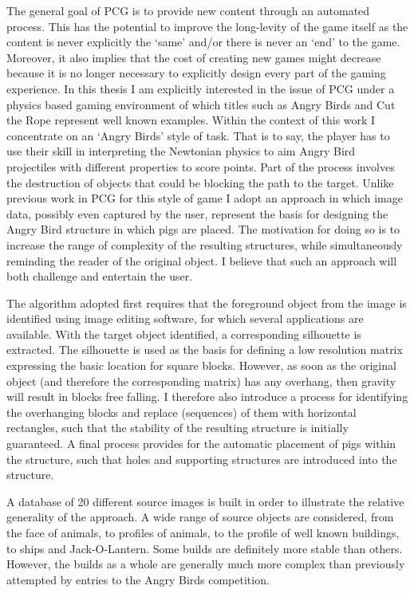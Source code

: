\documentclass{dalthesis}
\begin{document}
The general goal of PCG is to provide new content through an automated process. This has the potential to improve the long-levity of the game itself as the content is never explicitly the ‘same’ and/or there is never an ‘end’ to the game. Moreover, it also implies that the cost of creating new games might decrease because it is no longer necessary to explicitly design every part of the gaming experience. In this thesis I am explicitly interested in the issue of PCG under a physics based gaming environment of which titles such as Angry Birds and Cut the Rope represent well known examples. Within the context of this work I concentrate on an ‘Angry Birds’ style of task. That is to say, the player has to use their skill in interpreting the Newtonian physics to aim Angry Bird projectiles with different properties to score points. Part of the process involves the destruction of objects that could be blocking the path to the target. Unlike previous work in PCG for this style of game I adopt an approach in which image data, possibly even captured by the user, represent the basis for designing the Angry Bird structure in which pigs are placed. The motivation for doing so is to increase the range of complexity of the resulting structures, while simultaneously reminding the reader of the original object. I believe that such an approach will both challenge and entertain the user.

The algorithm adopted first requires that the foreground object from the image is identified using image editing software, for which several applications are available. With the target object identified, a corresponding silhouette is extracted. The silhouette is used as the basis for defining a low resolution matrix expressing the basic location for square blocks. However, as soon as the original object (and therefore the corresponding matrix) has any overhang, then gravity will result in blocks free falling. I therefore also introduce a process for identifying the overhanging blocks and replace (sequences) of them with horizontal rectangles, such that the stability of the resulting structure is initially guaranteed. A final process provides for the automatic placement of pigs within the structure, such that holes and supporting structures are introduced into the structure.

A database of 20 different source images is built in order to illustrate the relative generality of the approach. A wide range of source objects are considered, from the face of animals, to profiles of animals, to the profile of well known buildings, to ships and Jack-O-Lantern. Some builds are definitely more stable than others. However, the builds as a whole are generally much more complex than previously attempted by entries to the Angry Birds competition.
\end{document}
